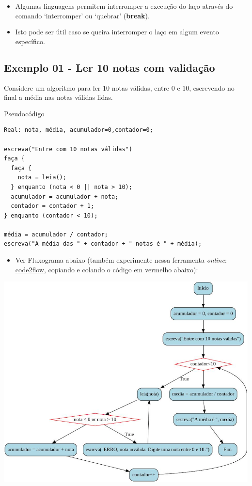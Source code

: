 \documentclass[12pt,a4paper]{article}
\providecommand{\tightlist}{%
      \setlength{\itemsep}{0pt}\setlength{\parskip}{0pt}}
\begin{document}
    \begin{itemize}
\item
  Algumas linguagens permitem interromper a execução do laço através do
  comando `interromper' ou `quebrar' (\textbf{break}).
\item
  Isto pode ser útil caso se queira interromper o laço em algum evento
  específico.
\end{itemize}

    \hypertarget{exemplo-01---ler-10-notas-com-validauxe7uxe3o}{%
\subsection{Exemplo 01 - Ler 10 notas com
validação}\label{exemplo-01---ler-10-notas-com-validauxe7uxe3o}}

Considere um algoritmo para ler 10 notas válidas, entre 0 e 10,
escrevendo no final a média nas notas válidas lidas.

    Pseudocódigo

\begin{verbatim}
Real: nota, média, acumulador=0,contador=0;

escreva("Entre com 10 notas válidas")
faça {
  faça {
    nota = leia();
  } enquanto (nota < 0 || nota > 10); 
  acumulador = acumulador + nota;
  contador = contador + 1;
} enquanto (contador < 10);

média = acumulador / contador;
escreva("A média das " + contador + " notas é " + média);
\end{verbatim}

    \begin{itemize}
\tightlist
\item
  Ver Fluxograma abaixo (também experimente nessa ferramenta
  \emph{online}: \href{https://app.code2flow.com/}{code2flow}, copiando
  e colando o código em vermelho abaixo):
\end{itemize}

\includegraphics{"figs/flowchartCap4c.png"}
\end{document}
